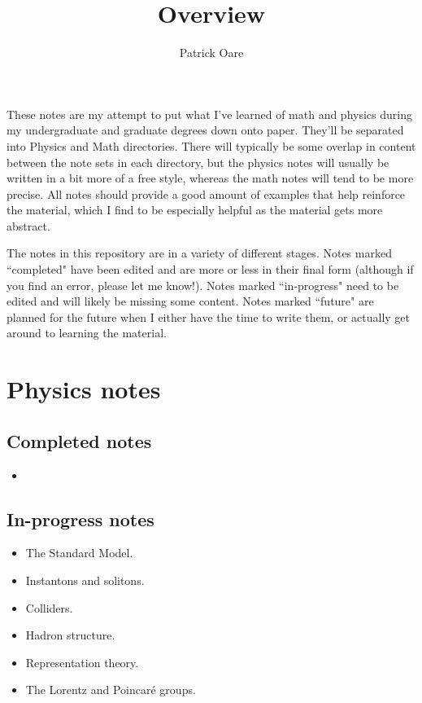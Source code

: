 \def \root {..}			%


\title{Overview}
\author{Patrick Oare}
\date{}							%


\maketitle

These notes are my attempt to put what I've learned of math and physics during my undergraduate and graduate degrees down onto paper. They'll be separated into Physics and Math directories. There will typically be some overlap in content between the note sets in each directory, but the physics notes will usually be written in a bit more of a free style, whereas the math notes will tend to be more precise. All notes should provide a good amount of examples that help reinforce the material, which I find to be especially helpful as the material gets more abstract. 

The notes in this repository are in a variety of different stages. Notes marked ``completed" have been edited and are more or less in their final form (although if you find an error, please let me know!). Notes marked ``in-progress" need to be edited and will likely be missing some content. Notes marked ``future" are planned for the future when I either have the time to write them, or actually get around to learning the material.

\section{Physics notes}

\subsection{Completed notes}

\begin{itemize}
	\item 
\end{itemize}

\subsection{In-progress notes}

\begin{itemize}
	\item The Standard Model.
	\item Instantons and solitons.
	\item Colliders.
	\item Hadron structure.
	\item Representation theory.
	\item The Lorentz and Poincar\'e groups.
\end{itemize}


